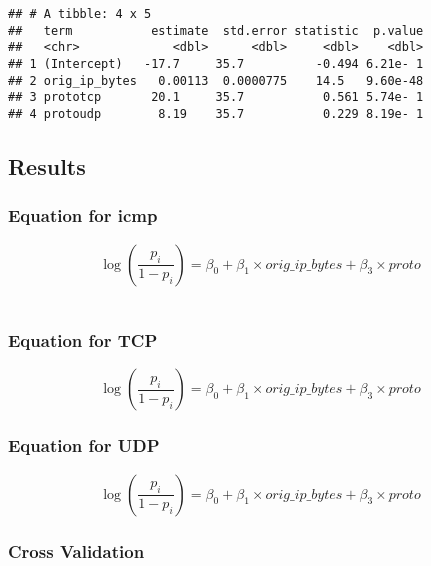\documentclass[
]{article}
\begin{document}
\begin{verbatim}
## # A tibble: 4 x 5
##   term           estimate  std.error statistic  p.value
##   <chr>             <dbl>      <dbl>     <dbl>    <dbl>
## 1 (Intercept)   -17.7     35.7          -0.494 6.21e- 1
## 2 orig_ip_bytes   0.00113  0.0000775    14.5   9.60e-48
## 3 prototcp       20.1     35.7           0.561 5.74e- 1
## 4 protoudp        8.19    35.7           0.229 8.19e- 1
\end{verbatim}

\hypertarget{results}{%
\subsection{Results}\label{results}}

\hypertarget{equation-for-icmp}{%
\subsubsection{Equation for icmp}\label{equation-for-icmp}}

\[
\begin{equation*}
\log\left(\frac{p_i}{1-p_i}\right) = \beta_0 + \beta_1 \times orig\_ip\_bytes + \beta_3 \times proto
\end{equation*}
\]\\

\hypertarget{equation-for-tcp}{%
\subsubsection{Equation for TCP}\label{equation-for-tcp}}

\[
\begin{equation*}
\log\left(\frac{p_i}{1-p_i}\right) = \beta_0 + \beta_1 \times orig\_ip\_bytes + \beta_3 \times proto
\end{equation*}
\]

\hypertarget{equation-for-udp}{%
\subsubsection{Equation for UDP}\label{equation-for-udp}}

\[
\begin{equation*}
\log\left(\frac{p_i}{1-p_i}\right) = \beta_0 + \beta_1 \times orig\_ip\_bytes + \beta_3 \times proto
\end{equation*}
\]

\hypertarget{cross-validation}{%
\subsubsection{Cross Validation}\label{cross-validation}}
\end{document}
